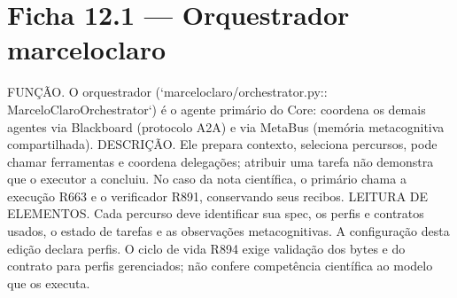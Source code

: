 \section{Ficha 12.1 — Orquestrador marceloclaro}
\label{mod12-f1}


\begin{descricao}
FUNÇÃO. O orquestrador  (`marceloclaro/orchestrator.py::
MarceloClaroOrchestrator`) é o agente primário do Core: coordena os demais
agentes via Blackboard (protocolo A2A) e via MetaBus (memória metacognitiva
compartilhada). DESCRIÇÃO. Ele prepara contexto, seleciona percursos, pode
chamar ferramentas e coordena delegações; atribuir uma tarefa não demonstra
que o executor a concluiu. No caso da nota científica, o primário chama a
execução R663 e o verificador R891, conservando seus recibos.
LEITURA DE ELEMENTOS. Cada percurso deve identificar sua spec, os perfis e
contratos usados, o estado de tarefas e as observações metacognitivas. A
configuração desta edição declara \CoreAgentCount{} perfis. O ciclo de vida
R894 exige validação dos bytes e do contrato para perfis gerenciados; não
confere competência científica ao modelo que os executa.
\end{descricao}

